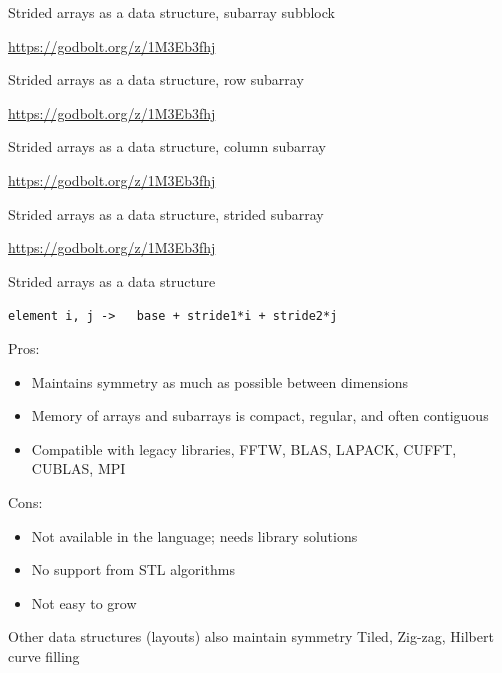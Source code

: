 \begin{frame}[label=strided1]{Strided arrays as a data structure, subarray subblock}
\vspace{-1.4cm}


\url{https://godbolt.org/z/1M3Eb3fhj}
\end{frame}

\begin{frame}[label=strided2]{Strided arrays as a data structure, row subarray}
\vspace{-1.4cm}


\url{https://godbolt.org/z/1M3Eb3fhj}
\end{frame}

\begin{frame}[label=strided3]{Strided arrays as a data structure, column subarray}
\vspace{-1.4cm}


\url{https://godbolt.org/z/1M3Eb3fhj}
\end{frame}

\begin{frame}[label=strided4]{Strided arrays as a data structure, strided subarray}
\vspace{-1.4cm}


\url{https://godbolt.org/z/1M3Eb3fhj}
\end{frame}

\begin{frame}[label=strided5]{Strided arrays as a data structure}
\begin{center}
\lstinline|element i, j ->   base + stride1*i + stride2*j|
\end{center}

Pros:
\begin{itemize}
  \item Maintains symmetry as much as possible between dimensions
  \item Memory of arrays and subarrays is compact, regular, and often contiguous
  \item Compatible with legacy libraries, FFTW, BLAS, LAPACK, CUFFT, CUBLAS, MPI
\end{itemize}
Cons:
\begin{itemize}
  \item Not available in the language; needs library solutions
  \item No support from STL algorithms
  \item Not easy to grow
\end{itemize}

\begin{alertblock}{Other data structures (layouts) also maintain symmetry}
  Tiled, Zig-zag, Hilbert curve filling
\end{alertblock}

\end{frame}

